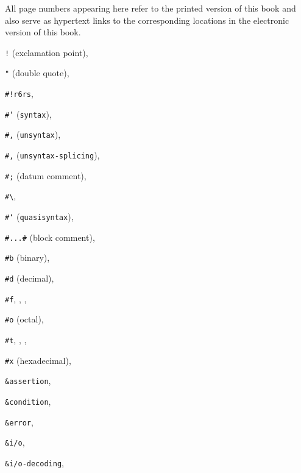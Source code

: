 
\label{tspl_h0}




All page numbers appearing here refer to the printed version of this
book and also serve as hypertext links to the corresponding locations
in the electronic version of this book.


   
{\footnotesize
\begin{multicols}{2}
\RaggedRight
\texttt{!} (exclamation point), \pageref{intro_s50}
  
\texttt{"} (double quote), \pageref{objects_s213}
  
\texttt{\#{}!r6rs}, \pageref{grammar_s12}
  
\texttt{\#{}'} (\texttt{syntax}), \textit{\pageref{syntax_s33}}
  
\texttt{\#{},} (\texttt{unsyntax}), \textit{\pageref{syntax_s40}}
  
\texttt{\#{},\@{}} (\texttt{unsyntax-splicing}), \textit{\pageref{syntax_s40}}
  
\texttt{\#{};} (datum comment), \pageref{grammar_s8}
  
\texttt{\#{}\textbackslash{}}, \pageref{objects_s200}
  
\texttt{\#{}`} (\texttt{quasisyntax}), \textit{\pageref{syntax_s40}}
  
\texttt{\#{}\textbar{}...\textbar{}\#{}} (block comment), \pageref{grammar_s10}
  
\texttt{\#{}b} (binary), \pageref{objects_s78}
  
\texttt{\#{}d} (decimal), \pageref{objects_s80}
  
\texttt{\#{}f}, \pageref{intro_s39}, \pageref{start_s105}, \pageref{objects_s8}
  
\texttt{\#{}o} (octal), \pageref{objects_s79}
  
\texttt{\#{}t}, \pageref{intro_s38}, \pageref{start_s104}, \pageref{objects_s7}
  
\texttt{\#{}x} (hexadecimal), \pageref{objects_s81}
  
\texttt{\&{}assertion}, \textit{\pageref{exceptions_s21}}
  
\texttt{\&{}condition}, \textit{\pageref{exceptions_s13}}
  
\texttt{\&{}error}, \textit{\pageref{exceptions_s22}}
  
\texttt{\&{}i/o}, \textit{\pageref{exceptions_s32}}
  
\texttt{\&{}i/o-decoding}, \textit{\pageref{exceptions_s42}}
  

\end{multicols}}
